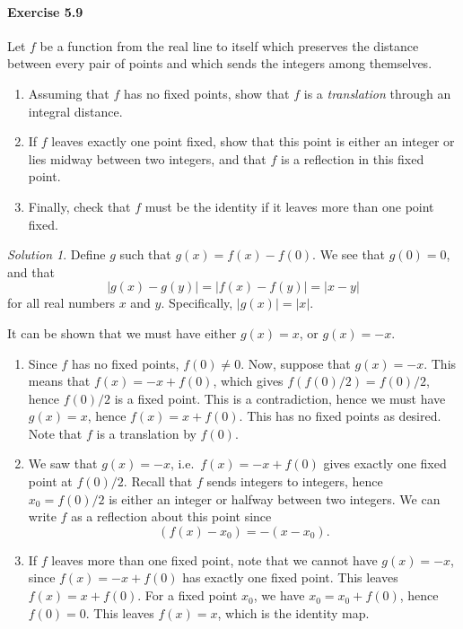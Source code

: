 \documentclass[11pt]{report}
\theoremstyle{remark}
\newtheorem*{solution}{Solution}
\begin{document}
    \paragraph{Exercise 5.9} Let $f$ be a function from the real line to itself which
    preserves the distance between every pair of points and which sends the integers
    among themselves.
    \begin{enumerate}
        \itemsep0em   
        \item Assuming that $f$ has no fixed points, show that $f$ is a
        \textit{translation} through an integral distance.
        \item If $f$ leaves exactly one point fixed, show that this point is either
        an integer or lies midway between two integers, and that $f$ is a reflection
        in this fixed point.
        \item Finally, check that $f$ must be the identity if it leaves more than
        one point fixed.
    \end{enumerate}
    \begin{solution}
        Define $g$ such that $g(x) = f(x) - f(0)$. We see that $g(0) = 0$, and that
        \[
            |g(x) - g(y)| = |f(x) - f(y)| = |x - y|
        \] for all real numbers $x$ and $y$. Specifically, $|g(x)| = |x|$.

        It can be shown that we must have either $g(x) = x$, or $g(x) = -x$.

        \begin{enumerate}
            \item Since $f$ has no fixed points, $f(0) \neq 0$. Now, suppose that
            $g(x) = -x$. This means that $f(x) = -x + f(0)$, which gives $f(f(0) /
            2) = f(0) / 2$, hence $f(0) / 2$ is a fixed point. This is a
            contradiction, hence we must have $g(x) = x$, hence $f(x) = x + f(0)$.
            This has no fixed points as desired. Note that $f$ is a translation by
            $f(0)$.

            \item We saw that $g(x) = -x$, i.e.\ $f(x) = -x + f(0)$ gives exactly
            one fixed point at $f(0) / 2$. Recall that $f$ sends integers to
            integers, hence $x_0 = f(0) / 2$ is either an integer or halfway between
            two integers. We can write $f$ as a reflection about this point since \[
                (f(x) - x_0) = -(x - x_0).
            \] 

            \item If $f$ leaves more than one fixed point, note that we cannot have
            $g(x) = -x$, since $f(x) = -x + f(0)$ has exactly one fixed point. This
            leaves $f(x) = x + f(0)$. For a fixed point $x_0$, we have $x_0 = x_0 +
            f(0)$, hence $f(0) = 0$. This leaves $f(x) = x$, which is the identity
            map.
        \end{enumerate}
    \end{solution}
\end{document}
